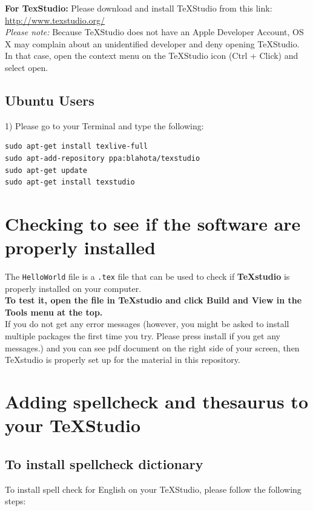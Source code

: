 \documentclass[]{article}
\begin{document}
\textbf{For TexStudio:}
Please download and install TeXStudio from this link: \url{http://www.texstudio.org/} \\

\textit{Please note:} Because TeXStudio does not have an Apple Developer Account, OS X may complain about an unidentified developer and deny opening TeXStudio. In that case, open the context menu on the TeXStudio icon (Ctrl + Click) and select open.

\subsection*{Ubuntu Users}

1) Please go to your Terminal and type the following:
\begin{verbatim}
sudo apt-get install texlive-full
sudo apt-add-repository ppa:blahota/texstudio 
sudo apt-get update 
sudo apt-get install texstudio
\end{verbatim}


\section*{Checking to see if the software are properly installed}

The \texttt{HelloWorld} file is a \texttt{.tex} file that can be used to check if \textbf{TeXstudio} is properly installed on your computer. \\

\textbf{To test it, open the file in TeXstudio and click Build and View in the Tools menu at the top. } \\

If you do not get any error messages (however, you might be asked to install multiple packages the first time you try. Please press install if you get any messages.) and you can see pdf document on the right side of your screen,  then TeXstudio is properly set up for the material in this repository. 

\section*{Adding spellcheck and thesaurus to your TeXStudio}

\subsection*{To install spellcheck dictionary}
To install spell check for English on your TeXStudio, please follow the following steps:
\end{document}
